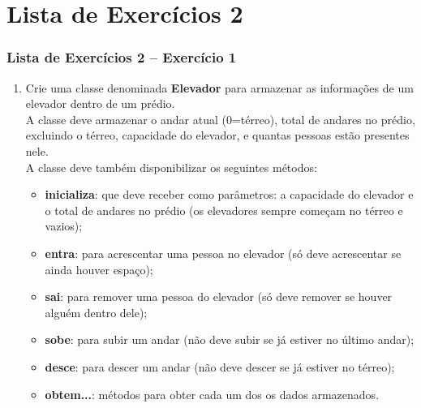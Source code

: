 \documentclass[aspectratio=169]{beamer}
\newcommand\setItemnumber[1]{\setcounter{enumi}{\numexpr#1-1\relax}}
\begin{document}
\section{Lista de Exercícios 2}

\begin{frame}\frametitle{Lista de Exercícios 2 -- Exercício 1}
\begin{enumerate}
	\setItemnumber{1}
	\item Crie uma classe denominada \textbf{Elevador} para armazenar as informações de um elevador dentro de um prédio.\\
	A classe deve armazenar o andar atual (0=térreo), total de andares no prédio, excluindo o térreo, capacidade do elevador, e quantas pessoas estão presentes nele.\\
	A classe deve também disponibilizar os seguintes métodos:
	\begin{itemize}
		\item \textbf{inicializa}: que deve receber como parâmetros: a capacidade do elevador e o total de andares no prédio (os elevadores sempre começam no térreo e vazios);
		\item \textbf{entra}: para acrescentar uma pessoa no elevador (só deve acrescentar se ainda houver
espaço);
		\item \textbf{sai}: para remover uma pessoa do elevador (só deve remover se houver alguém dentro
dele);
		\item \textbf{sobe}: para subir um andar (não deve subir se já estiver no último andar);
		\item \textbf{desce}: para descer um andar (não deve descer se já estiver no térreo);
		\item \textbf{obtem...}: métodos para obter cada um dos os dados armazenados.
	\end{itemize}
\end{enumerate}
\end{frame}
\end{document}
